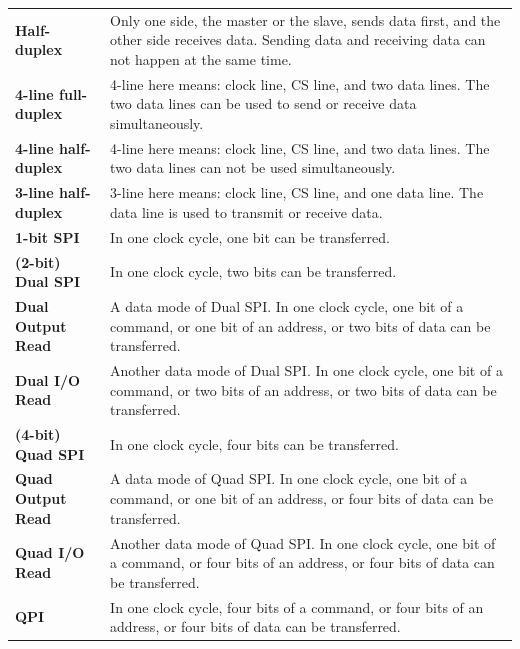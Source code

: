 \begin{longtable}[c]{ R{7cm} p{10cm} }
\textbf{Half-duplex} & Only one side, the master or the slave, sends data first, and the other side receives data. Sending data and receiving data can not happen at the same time.\\
\textbf{4-line full-duplex} & 4-line here means: clock line, CS line, and two data lines. The two data lines can be used to send or receive data simultaneously.\\
\textbf{4-line half-duplex} & 4-line here means: clock line, CS line, and two data lines. The two data lines can not be used simultaneously.\\
\textbf{3-line half-duplex} & 3-line here means: clock line, CS line, and one data line. The data line is used to transmit or receive data. \\
\textbf{1-bit SPI} & In one clock cycle, one bit can be transferred.\\
\textbf{(2-bit) Dual SPI} & In one clock cycle, two bits can be transferred. \\
\textbf{Dual Output Read} & A data mode of Dual SPI. In one clock cycle, one bit of a command, or one bit of an address, or two bits of data can be transferred.\\
\textbf{Dual I/O Read} & Another data mode of Dual SPI. In one clock cycle, one bit of a command, or two bits of an address, or two bits of data can be transferred.\\
\textbf{(4-bit) Quad SPI} & In one clock cycle, four bits can be transferred. \\
\textbf{Quad Output Read} & A data mode of Quad SPI. In one clock cycle, one bit of a command, or one bit of an address, or four bits of data can be transferred.\\
\textbf{Quad I/O Read} & Another data mode of Quad SPI. In one clock cycle, one bit of a command, or four bits of an address, or four bits of data can be transferred.\\
\textbf{QPI} & In one clock cycle, four bits of a command, or four bits of an address, or four bits of data can be transferred.\\
\end{longtable}
